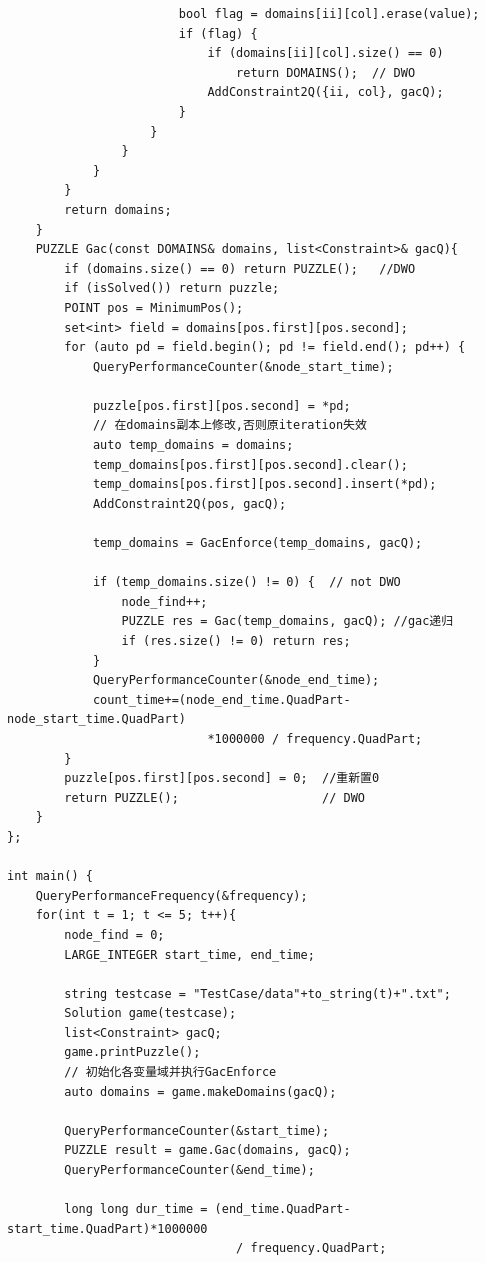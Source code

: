 \documentclass{article}
\begin{document}
\begin{lstlisting}
                        bool flag = domains[ii][col].erase(value);
                        if (flag) {
                            if (domains[ii][col].size() == 0) 
                            	return DOMAINS();  // DWO
                            AddConstraint2Q({ii, col}, gacQ);
                        }
                    }
                }
            }
        }
        return domains;
    }
    PUZZLE Gac(const DOMAINS& domains, list<Constraint>& gacQ){
        if (domains.size() == 0) return PUZZLE();   //DWO
        if (isSolved()) return puzzle;
        POINT pos = MinimumPos();
        set<int> field = domains[pos.first][pos.second];
        for (auto pd = field.begin(); pd != field.end(); pd++) {
            QueryPerformanceCounter(&node_start_time);
            
            puzzle[pos.first][pos.second] = *pd;
            // 在domains副本上修改,否则原iteration失效
            auto temp_domains = domains;          
            temp_domains[pos.first][pos.second].clear();
            temp_domains[pos.first][pos.second].insert(*pd);
            AddConstraint2Q(pos, gacQ);
            
            temp_domains = GacEnforce(temp_domains, gacQ);
            
            if (temp_domains.size() != 0) {  // not DWO
                node_find++;
                PUZZLE res = Gac(temp_domains, gacQ); //gac递归
                if (res.size() != 0) return res; 
            }
            QueryPerformanceCounter(&node_end_time);
            count_time+=(node_end_time.QuadPart-node_start_time.QuadPart)
            				*1000000 / frequency.QuadPart;
        }
        puzzle[pos.first][pos.second] = 0;  //重新置0
        return PUZZLE();                    // DWO
    }
};

int main() {
    QueryPerformanceFrequency(&frequency);
    for(int t = 1; t <= 5; t++){
        node_find = 0;
        LARGE_INTEGER start_time, end_time;
        
        string testcase = "TestCase/data"+to_string(t)+".txt";
        Solution game(testcase);
        list<Constraint> gacQ;
        game.printPuzzle();
        // 初始化各变量域并执行GacEnforce
        auto domains = game.makeDomains(gacQ); 
        
        QueryPerformanceCounter(&start_time);
        PUZZLE result = game.Gac(domains, gacQ);
        QueryPerformanceCounter(&end_time);
        
        long long dur_time = (end_time.QuadPart-start_time.QuadPart)*1000000 
                                / frequency.QuadPart;
        

\end{lstlisting}
\end{document}
